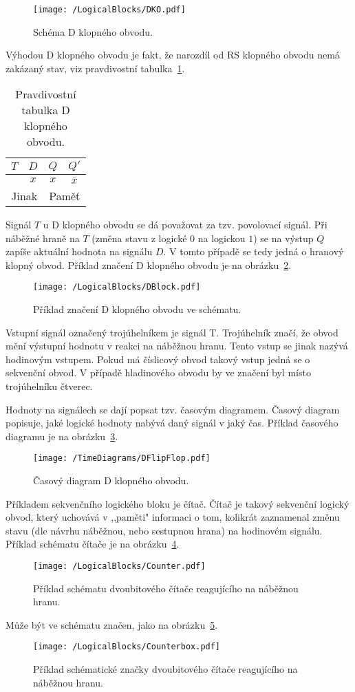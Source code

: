 \documentclass{report}
\begin{document}
\begin{figure}
\centering
\texttt{[image: /LogicalBlocks/DKO.pdf]}
\caption{Schéma D klopného obvodu.}
\label{fig:dko}
\end{figure}
Výhodou D klopného obvodu je fakt, že narozdíl od RS klopného obvodu nemá zakázaný stav, viz pravdivostní tabulka~\ref{tab:dkotab}.
\begin{table}
\centering
 \begin{tabular}{ |c c|c c| } 
   	\hline
	$T$ & $D$ & $Q$ & $Q'$ \\
   	\hline
	\texttiming{LH} & $x$ & $x$ & $\overline{x}$\\
	\multicolumn{2}{|c|}{Jinak} & \multicolumn{2}{|c|}{Paměť}\\
   	\hline
\end{tabular}
	\caption{Pravdivostní tabulka D klopného obvodu.}
	\label{tab:dkotab}
\end{table}
Signál $T$ u D klopného obvodu se dá považovat za tzv. povolovací signál. Při náběžné hraně na $T$  (změna stavu z logické $0$ na logickou $1$) se na výstup $Q$ zapíše aktuální hodnota na signálu $D$. V tomto případě se tedy jedná o hranový klopný obvod. Příklad značení D klopného obvodu je na obrázku~\ref{fig:dblock}.
\begin{figure}
\centering
\texttt{[image: /LogicalBlocks/DBlock.pdf]}
\caption{Příklad značení D klopného obvodu ve schématu.}
\label{fig:dblock}
\end{figure}
Vstupní signál označený trojúhelníkem je signál T. Trojúhelník značí, že obvod mění výstupní hodnotu v reakci na náběžnou hranu. Tento vstup se jinak nazývá hodinovým vstupem. Pokud má číslicový obvod takový vstup jedná se o sekvenční obvod. V případě hladinového obvodu by ve značení byl místo trojúhelníku čtverec. \par
Hodnoty na signálech se dají popsat tzv. časovým diagramem. Časový diagram popisuje, jaké logické hodnoty nabývá daný signál v jaký čas. Příklad časového diagramu je na obrázku~\ref{fig:dkotd}.
\begin{figure}
\centering
\texttt{[image: /TimeDiagrams/DFlipFlop.pdf]}
\caption{Časový diagram D klopného obvodu.}
\label{fig:dkotd}
\end{figure}
\par
Příkladem sekvenčního logického bloku je čítač. Čítač je takový sekvenční logický obvod, který uchovává v ,,paměti" informaci o tom, kolikrát zaznamenal změnu stavu (dle návrhu náběžnou, nebo sestupnou hrana) na hodinovém signálu. Příklad schématu čítače je na obrázku~\ref{fig:counter}.
\begin{figure}
\centering
\texttt{[image: /LogicalBlocks/Counter.pdf]}
\caption{Příklad schématu dvoubitového čítače reagujícího na náběžnou hranu.}
\label{fig:counter}
\end{figure}
Může být ve schématu značen, jako na obrázku~\ref{fig:counterbox}.
\begin{figure}
\centering
\texttt{[image: /LogicalBlocks/Counterbox.pdf]}
\caption{Příklad schématické značky dvoubitového čítače reagujícího na náběžnou hranu.}
\label{fig:counterbox}
\end{figure}
\end{document}
